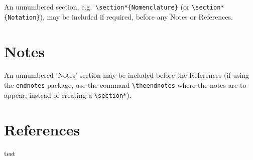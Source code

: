 \documentclass[]{interact}
\theoremstyle{plain}%
\theoremstyle{definition}
\theoremstyle{remark}
\begin{document}
An unnumbered section, e.g.\ \verb"\section*{Nomenclature}" (or \verb"\section*{Notation}"), may be included if required, before any Notes or References.


\section*{Notes}

An unnumbered `Notes' section may be included before the References (if using the \verb"endnotes" package, use the command \verb"\theendnotes" where the notes are to appear, instead of creating a \verb"\section*").


\section{References}

test\citep{quEffectsSandBurial2017}



\end{document}
